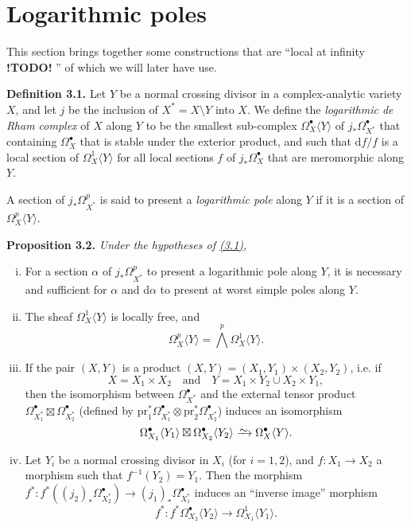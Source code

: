 \documentclass{report}
\newenvironment{itenv}[1]
  {\phantomsection\par\medskip\noindent\textbf{#1.}\itshape}
  {\medskip}
\newenvironment{rmenv}[1]
  {\phantomsection\par\medskip\noindent\textbf{#1.}\rmfamily}
  {\medskip}
\newcommand{\dd}{\mathrm{d}}
\newcommand{\pr}{\mathrm{pr}}
\newcommand{\simto}{\xrightarrow{\raisebox{-0.7ex}[0ex][0ex]{$\sim$}}}
\newcommand{\todo}{\textbf{ !TODO! }}
\newcommand{\oldpage}[1]{\marginpar{\footnotesize$\Big\vert$ \textit{p.~#1}}}
\begin{document}
\section{Logarithmic poles}
\label{II.3}

\oldpage{72}

This section brings together some constructions that are ``local at infinity\todo'' of which we will later have use.

\begin{rmenv}{Definition 3.1}
\label{II.3.1}
  Let $Y$ be a normal crossing divisor in a complex-analytic variety $X$, and let $j$ be the inclusion of $X^*=X\setminus Y$ into $X$.
  We define the \emph{logarithmic de Rham complex} of $X$ along $Y$ to be the smallest sub-complex $\Omega_X^\bullet\langle Y\rangle$ of $j_*\Omega_{X^*}^\bullet$ that containing $\Omega_X^\bullet$ that is stable under the exterior product, and such that $\dd f/f$ is a local section of $\Omega_X^1\langle Y\rangle$ for all local sections $f$ of $j_*\Omega_X^\bullet$ that are meromorphic along $Y$.

  A section of $j_*\Omega_{X^*}^p$ is said to present a \emph{logarithmic pole} along $Y$ if it is a section of $\Omega_X^p\langle Y\rangle$.
\end{rmenv}

\begin{itenv}{Proposition 3.2}
\label{II.3.2}
  Under the hypotheses of \hyperref[II.3.1]{(3.1)},
  \begin{enumerate}[(i)]
    \item For a section $\alpha$ of $j_*\Omega_{X^*}^p$ to present a logarithmic pole along $Y$, it is necessary and sufficient for $\alpha$ and $\dd\alpha$ to present at worst simple poles along $Y$.
    \item The sheaf $\Omega_X^1\langle Y\rangle$ is locally free, and
      \[
        \Omega_X^p\langle Y\rangle = \bigwedge^p \Omega_X^1\langle Y\rangle.
      \]
    \item If the pair $(X,Y)$ is a product $(X,Y)=(X_1,Y_1)\times(X_2,Y_2)$, i.e. if
      \[
        X = X_1\times X_2
        \quad\mbox{and}\quad
        Y = X_1\times Y_2 \cup X_2\times Y_1,
      \]
      then the isomorphism between $\Omega_{X^*}^\bullet$ and the external tensor product $\Omega_{X_1^*}^\bullet\boxtimes\Omega_{X_2^*}^\bullet$ (defined by $\pr_1^*\Omega_{X_1^*}^\bullet\otimes\pr_2^*\Omega_{X_2^*}^\bullet$) induces an isomorphism
      \[
        \Omega_{X_1}^\bullet\langle Y_1\rangle \boxtimes \Omega_{X_2}^\bullet\langle Y_2\rangle
        \simto \Omega_X^\bullet\langle Y\rangle.
      \]
    \item Let $Y_i$ be a normal crossing divisor in $X_i$ (for $i=1,2$), and $f\colon X_1\to X_2$ a morphism such that $f^{-1}(Y_2)=Y_1$.
      Then the morphism $f^*\colon f^*((j_2)_*\Omega_{X_2^*}^\bullet)\to (j_1)_*\Omega_{X_1^*}^\bullet$ induces an ``inverse image'' morphism
      \[
        f^*\colon f^*\Omega_{X_2}^\bullet\langle Y_2\rangle \to \Omega_{X_1}^1\langle Y_1\rangle.
      \]
  \end{enumerate}
\end{itenv}
\end{document}
